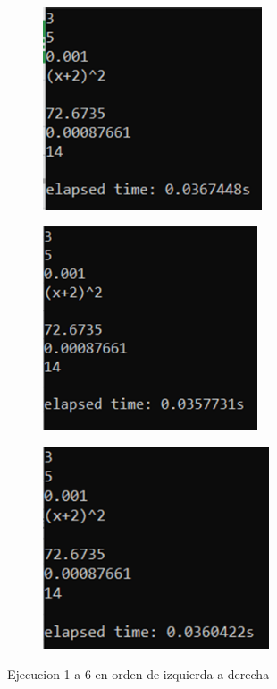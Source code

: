 \documentclass[12pt, letterpaper]{article}
\begin{document}
\begin{flushleft}
\begin{figure}[H]
\begin{subfigure}{0.49\textwidth}
            \includegraphics[width=1\linewidth, height=6cm]{Imagen4}
        \end{subfigure}
        \begin{subfigure}{0.49\textwidth}
            \includegraphics[width=1\linewidth, height=6cm]{Imagen5}
        \end{subfigure}
        \begin{subfigure}{0.49\textwidth}
            \includegraphics[width=1\linewidth, height=6cm]{Imagen6}
        \end{subfigure}
        \caption{Ejecucion 1 a 6 en orden de izquierda a derecha}
    \end{figure}
    \begin{figure}[H]
        \begin{subfigure}{0.49\textwidth}

\end{subfigure}
\end{figure}
\end{flushleft}
\end{document}
